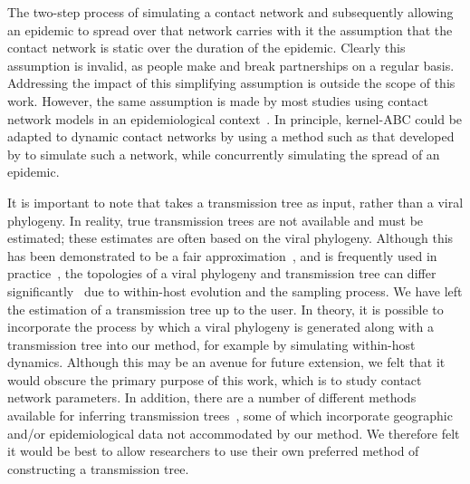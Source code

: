 
The two-step process of simulating a contact network and subsequently allowing
an epidemic to spread over that network carries with it the assumption that the
contact network is static over the duration of the epidemic. Clearly this
assumption is invalid, as people make and break partnerships on a regular
basis. Addressing the impact of this simplifying assumption is outside the
scope of this work. However, the same assumption is made by most studies using
contact network models in an epidemiological
context~\autocite{welch2011statistical, bansal2007individual}. In principle,
kernel-\gls{ABC} could be adapted to dynamic contact networks by using a method
such as that developed by \textcite{robinson2012dynamics} to simulate such a
network, while concurrently simulating the spread of an epidemic.

It is important to note that  takes a transmission tree as
input, rather than a viral phylogeny. In reality, true transmission trees are
not available and must be estimated; these estimates are often based on the
viral phylogeny. Although this has been demonstrated to be a fair
approximation~\autocite[e.g.][]{leitner1996accurate}, and is frequently used in
practice~\autocite[e.g.][]{stadler2013uncovering}, the topologies of a viral
phylogeny and transmission tree can differ
significantly~\autocite{ypma2013relating, hall2015epidemic} due to within-host
evolution and the sampling process. We have left the estimation of a
transmission tree up to the user. In theory, it is possible to incorporate the
process by which a viral phylogeny is generated along with a transmission tree
into our method, for example by simulating within-host dynamics. Although this
may be an avenue for future extension, we felt that it would obscure the
primary purpose of this work, which is to study contact network parameters. In
addition, there are a number of different methods available for inferring
transmission trees~\autocite{didelot2014bayesian, ypma2012unravelling,
jombart2011reconstructing, cottam2008integrating, hall2015epidemic}, some of
which incorporate geographic and/or epidemiological data not accommodated by
our method. We therefore felt it would be best to allow researchers to use
their own preferred method of constructing a transmission tree.

